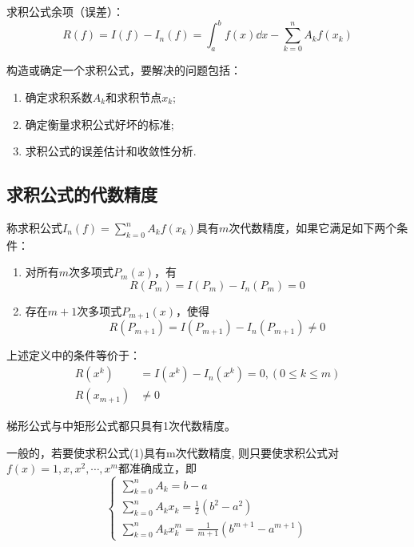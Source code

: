 求积公式余项（误差）：
\begin{equation*}
    R(f) = I(f)-I_n(f) = \int_{a}^{b}f(x)\dd{x}-\sum_{k=0}^{n} A_kf(x_k)
\end{equation*}

构造或确定一个求积公式，要解决的问题包括：
\begin{enumerate}
    \item 确定求积系数$A_k$和求积节点$x_k$;
    \item 确定衡量求积公式好坏的标准;
    \item 求积公式的误差估计和收敛性分析.
\end{enumerate}

\subsection{求积公式的代数精度}

\begin{definition}
    称求积公式$I_n(f)=\sum_{k=0}^{n}A_kf(x_k)$具有$m$次代数精度，如果它满足如下两个条件：
    \begin{enumerate}
        \item 对所有$m$次多项式$P_m(x)$，有
        \begin{equation*}
            R(P_m) = I(P_m)-I_n(P_m) = 0
        \end{equation*}
        \item 存在$m+1$次多项式$P_{m+1}(x)$，使得
        \begin{equation*}
            R(P_{m+1}) = I(P_{m+1})-I_n(P_{m+1}) \ne 0
        \end{equation*}
    \end{enumerate}
    上述定义中的条件等价于：
    \begin{align*}
         R(x^k) &= I(x^k)-I_n(x^k) = 0,(0\leq k\leq m)\\
         R(x_{m+1})&\neq 0
    \end{align*}
    \begin{notice}
        梯形公式与中矩形公式都只具有1次代数精度。
    \end{notice}
\end{definition}



一般的，若要使求积公式(1)具有m次代数精度, 则只要使求积公式对$f(x) = 1,x,x^2,\cdots,x^m$都准确成立，即
\begin{equation*}
    \begin{cases}
        \sum_{k=0}^{n}A_k = b-a\\
        \sum_{k=0}^{n}A_kx_k = \frac{1}{2}(b^2-a^2)\\
        \sum_{k=0}^{n}A_kx^m_k = \frac{1}{m+1}(b^{m+1}-a^{m+1})
    \end{cases}
\end{equation*}

